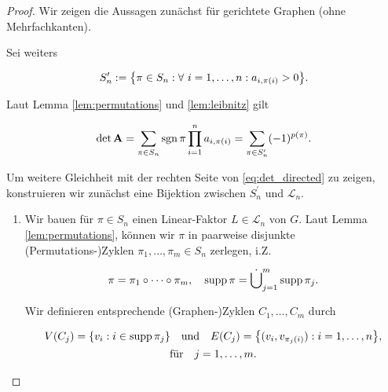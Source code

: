         \begin{proof}

            Wir zeigen die Aussagen zunächst für gerichtete Graphen (ohne Mehrfachkanten).

            Sei weiters

            \begin{align*}
                S_n^\prime
                :=
                {\left \{ \pi \in S_n: \forall ~ i = 1, \dots, n: a_{i, \pi(i)} > 0 \right \}}.
            \end{align*}

            Laut Lemma \ref{lem:permutations} und \ref{lem:leibnitz} gilt

            \begin{align*}
                \det \mathbf A
                =
                \sum_{\pi \in S_n}
                    \operatorname{sgn} \pi
                    \prod_{i=1}^n
                        a_{i, \pi(i)}
                =
                \sum_{\pi \in S_n^\prime}
                    (-1)^{p(\pi)}.
            \end{align*}

            Um weitere Gleichheit mit der rechten Seite von \ref{eq:det_directed} zu zeigen, konstruieren wir zunächst eine Bijektion zwischen $S_n^\prime$ und $\mathcal L_n$.

            \begin{enumerate}[label = \arabic*.]

                \item Wir bauen für $\pi \in S_n$ einen Linear-Faktor $L \in \mathcal L_n$ von $G$.
                Laut Lemma \ref{lem:permutations}, können wir $\pi$ in paarweise disjunkte (Permutations-)Zyklen $\pi_1, \dots, \pi_m \in S_n$ zerlegen, i.Z.

                \begin{align*}
                    \pi = \pi_1 \circ \cdots \circ \pi_m,
                    \quad
                    \operatorname{supp} \pi = \dot \bigcup_{j=1}^m \operatorname{supp} \pi_j.
                \end{align*}

                Wir definieren entsprechende (Graphen-)Zyklen $C_1, \dots, C_m$ durch

                \begin{multline*}
                    V(C_j) = {\left \{ v_i: i \in \operatorname{supp} \pi_j \right \}}
                    \quad
                    \text{und}
                    \quad
                    E(C_j) = {\left \{ (v_i, v_{\pi_j(i)}): i = 1, \dots, n \right \}}, \\
                    \text{für}
                    \quad
                    j = 1, \dots, m.
                \end{multline*}


\end{enumerate}
\end{proof}
